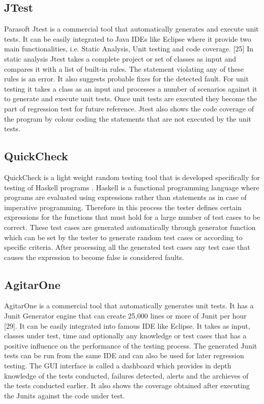 \subsection{JTest}
Parasoft Jtest is a commercial tool that automatically generates and execute unit tests. It can be easily integrated to Java IDEs like Eclipse where it provide two main functionalities, i.e. Static Analysis, Unit testing and code coverage. [25]
In static analysis Jtest takes a complete project or set of classes as input and compares it with a list of built-in rules. The statement violating any of these rules is an error. It also suggests probable fixes for the detected fault.
For unit testing it takes a class as an input and processes a number of scenarios against it to generate and execute unit tests. Once unit tests are executed they become the part of regression test for future reference.
Jtest also shows the code coverage of the program by colour coding the statements that are not executed by the unit tests.

\subsection{QuickCheck}
QuickCheck \cite{Claessen2000} is a light weight random testing tool that is developed specifically for testing of Haskell programs \cite{Hudak2007}. Haskell is a functional programming language where programs are evaluated using expressions rather than statements as in case of imperative programming. Therefore in this process the tester defines certain expressions for the functions that must hold for a large number of test cases to be correct. These test cases are generated automatically through generator function which can be set by the tester to generate random test cases or according to specific criteria. After processing all the generated test cases any test case that causes the expression to become false is considered faults.

\subsection{AgitarOne}
AgitarOne is a commercial tool that automatically generates unit tests. It has a Junit Generator engine that can create 25,000 lines or more of Junit per hour [29]. It can be easily integrated into famous IDE like Eclipse. It takes as input, classes under test, time and optionally any knowledge or test cases that has a positive influence on the performance of the testing process. The generated Junit tests can be run from the same IDE and can also be used for later regression testing. The GUI interface is called a dashboard which provides in depth knowledge of the tests conducted, failures detected, alerts and the archieves of the tests conducted earlier. It also shows the coverage obtained after executing the Junits against the code under test.

